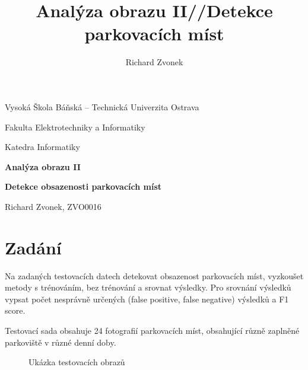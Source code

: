 \documentclass[10pt,a4paper]{article}
\title{Analýza obrazu II//Detekce parkovacích míst}
\author{Richard Zvonek}
\begin{document}
\begin{center}
  {\Large Vysoká Škola Báňská – Technická Univerzita Ostrava\par
    Fakulta Elektrotechniky a Informatiky\par
    Katedra Informatiky\par}
  \vspace{26mm}
  {\Huge\bfseries Analýza obrazu II \par}
  \bigskip
  {\Huge\bfseries Detekce obsazenosti parkovacích míst \par}
\end{center}
\vfill
{\Large\number\year\hfill Richard Zvonek, ZVO0016}
\cleardoublepage

\newpage

\tableofcontents

\newpage

\section{Zadání}
Na zadaných testovacích datech detekovat obsazenost parkovacích míst, vyzkoušet metody s trénováním, bez trénování a srovnat výsledky. Pro srovnání výsledků vypsat počet nesprávně určených (false positive, false negative) výsledků a F1 score.\par
Testovací sada obsahuje 24 fotografií parkovacích míst, obsahující různě zaplněné parkoviště v různé denní doby.

\begin{figure}[ht]%
  \centering
  \qquad
  \qquad

  \caption{Ukázka testovacích obrazů}%
  \label{fig:testData}%
\end{figure}
\end{document}
